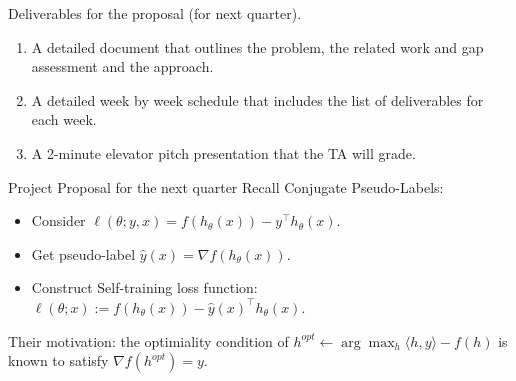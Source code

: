 \documentclass{beamer}
\begin{document}
\begin{frame}{Deliverables for the proposal (for next quarter).}

\Large 
\begin{enumerate}
\item A detailed document that outlines the problem, the related work and gap assessment and the approach.
\item A detailed week by week schedule that includes the list of deliverables for each week.
\item A 2-minute elevator pitch presentation that the TA will grade.
\end{enumerate}

\end{frame}

\begin{frame}{Project Proposal for the next quarter}
Recall Conjugate Pseudo-Labels:
\Large 
\begin{exampleblock}{}
\begin{itemize}
 \item Consider $\ell(\theta;y,x) = f( h_{\theta}(x) ) - y^\top h_{\theta}(x)$.  
 \item Get pseudo-label $\hat{y}(x) = \nabla f( h_{\theta}(x) )$.
 \item Construct Self-training loss function: $\ell(\theta;x):=f( h_{\theta}(x) ) - \hat{y}(x)^\top h_{\theta}(x)$.
\end{itemize}
\end{exampleblock}

Their motivation:
the optimiality condition of
$h^{opt} \gets \arg\max_{h} \langle h, y \rangle - f(h)$ is known to satisfy $\nabla f(h^{opt})=y$.
\end{frame}
\end{document}
